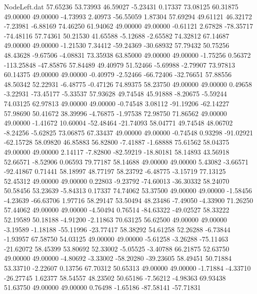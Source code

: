 \begin{filecontents}{NodeLeft.dat}
  57.65236   53.73993   46.59027    -5.23431    0.17337   73.08125   60.31875   49.00000   49.00000   -4.73993    2.40973  -56.55059    1.87304
  57.69294   49.61121   46.32172    -7.23981   -6.88169   74.46250   61.94062   49.00000   49.00000   -0.61121    2.67828  -78.35717  -74.48116
  57.74361   50.21530   41.65588    -5.12688   -2.65582   74.32812   67.14687   49.00000   49.00000   -1.21530    7.34412  -59.24369  -30.68932
  57.79432   50.75256   48.43628    -9.67506   -4.08831   73.35938   63.85000   49.00000   49.00000   -1.75256    0.56372 -113.25848  -47.85876
  57.84489   49.40979   51.52466    -5.69988   -2.79907   73.97813   60.14375   49.00000   49.00000   -0.40979   -2.52466  -66.72406  -32.76651
  57.88556   48.50342   52.22931    -6.48775   -0.47126   74.89375   58.23750   49.00000   49.00000    0.49658   -3.22931  -73.45177   -5.33537
  57.93628   49.74548   45.91888    -8.20675   -5.59244   74.03125   62.97813   49.00000   49.00000   -0.74548    3.08112  -91.19206  -62.14227
  57.98690   50.41672   38.39996    -4.76875   -1.97538   72.98750   71.86562   49.00000   49.00000   -1.41672   10.60004  -52.48464  -21.74093
  58.04771   49.74548   48.06702    -8.24256   -5.62825   73.06875   67.33437   49.00000   49.00000   -0.74548    0.93298  -91.02921  -62.15728
  58.09820   46.85883   56.82800    -7.41887   -1.68888   75.61562   58.04375   49.00000   49.00000    2.14117   -7.82800  -82.59219  -18.80181
  58.14893   43.56918   52.66571    -8.52906    0.06593   79.77187   58.14688   49.00000   49.00000    5.43082   -3.66571  -92.41867    0.71441
  58.18997   48.77197   58.23792    -6.48775   -3.15719   77.13125   52.45312   49.00000   49.00000    0.22803   -9.23792  -74.60013  -36.30332
  58.24070   50.58456   53.23639    -5.84313    0.17337   74.74062   53.37500   49.00000   49.00000   -1.58456   -4.23639  -66.63706    1.97716
  58.29147   53.50494   48.23486    -7.49050   -4.33900   71.26250   57.44062   49.00000   49.00000   -4.50494    0.76514  -84.63322  -49.02527
  58.33222   52.19589   50.18188    -4.91200   -2.11863   70.63125   56.62500   49.00000   49.00000   -3.19589   -1.18188  -55.11996  -23.77417
  58.38292   54.61258   52.26288    -6.73844   -1.93957   67.58750   54.03125   49.00000   49.00000   -5.61258   -3.26288  -75.11463  -21.62072
  58.45399   53.80692   52.33002    -5.05525   -3.40788   66.21875   52.63750   49.00000   49.00000   -4.80692   -3.33002  -58.20280  -39.23605
  58.49451   50.71884   53.33710    -2.22607    0.13756   67.70312   50.65313   49.00000   49.00000   -1.71884   -4.33710  -26.27745    1.62377
  58.54557   48.23502   50.65186    -7.56212   -4.98363   69.93438   51.63750   49.00000   49.00000    0.76498   -1.65186  -87.58141  -57.71831

\end{filecontents}
